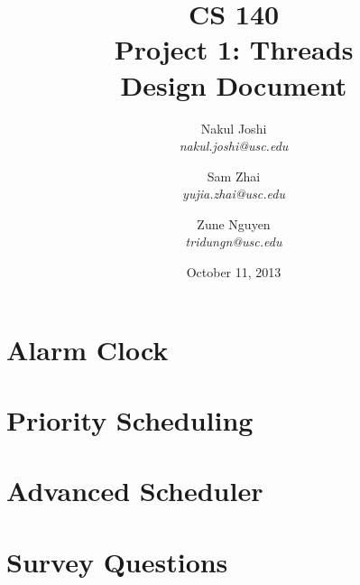 \documentclass[titlepage]{article}
\title{CS 140\\Project 1: Threads\\Design Document}
\author{
	Nakul Joshi\\ \textit{nakul.joshi@usc.edu}\and
	Sam Zhai\\ \textit{yujia.zhai@usc.edu}\and
	Zune Nguyen\\ \textit{tridungn@usc.edu}
	}
\date{October 11, 2013}
\begin{document}
\maketitle
\tableofcontents
\newpage

%	
\section{Alarm Clock}
	
	\newpage
\section{Priority Scheduling}
	
	\newpage
\section{Advanced Scheduler}
	
	\newpage
\section{Survey Questions}
	
\end{document}
